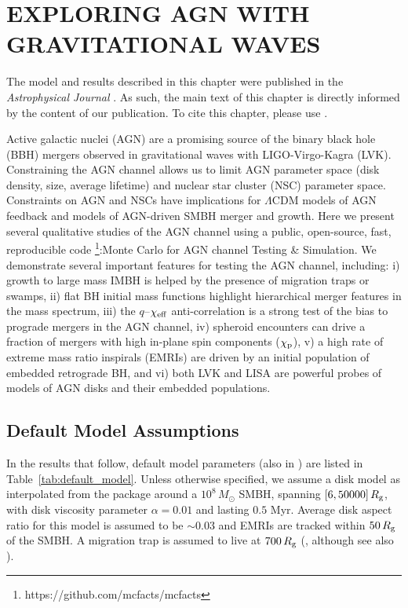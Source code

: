 
\section{\texorpdfstring{\MakeUppercase{exploring agn with gravitational waves}}{exploring agn with gravitational waves}}
\label{sec:chapter-agnbbh}


\par The model and results described in this chapter were published in the \textit{Astrophysical Journal} \citep{McKernan+25-mcfactsI}.
As such, the main text of this chapter is directly informed by the content of our publication.
To cite this chapter, please use \citet{McKernan+25-mcfactsI}.


Active galactic nuclei (AGN) are a promising source of the binary black hole (BBH) mergers observed in gravitational waves with LIGO-Virgo-Kagra (LVK).
Constraining the AGN channel allows us to limit AGN parameter space (disk density, size, average lifetime) and nuclear star cluster (NSC) parameter space.
Constraints on AGN and NSCs have implications for $\Lambda$CDM models of AGN feedback and models of AGN-driven SMBH merger and growth.
Here we present several qualitative studies of the AGN channel using a public, open-source, fast, reproducible code \footnote{https://github.com/mcfacts/mcfacts}:Monte Carlo for AGN channel Testing \& Simulation.
We demonstrate several important features for testing the AGN channel, including:
i) growth to large mass IMBH is helped by the presence of migration traps or swamps,
ii) flat BH initial mass functions highlight hierarchical merger features in the mass spectrum,
iii) the $q$--$\chi_{\rm eff}$ anti-correlation is a strong test of the bias to prograde mergers in the AGN channel,
iv) spheroid encounters can drive a fraction of mergers with high in-plane spin components ($\chi_{\rm p}$),
v) a high rate of extreme mass ratio inspirals (EMRIs) are driven by an initial population of embedded retrograde BH, and
vi) both LVK and LISA are powerful probes of models of AGN disks and their embedded populations.


\subsection{Default Model Assumptions}
\label{sec:mcfacts-assumptions}

In the results that follow, default model parameters (also in ) are listed in Table~\ref{tab:default_model}. Unless otherwise specified, we assume a \citet{SirkoGoodman03} disk model as interpolated from the  package \citep{Gangardt+24-pAGN} around a $10^{8}\,M_{\odot}$ SMBH, spanning $[6,50000]\,R_{\rm g}$, with disk viscosity parameter $\alpha=0.01$ and lasting $0.5$ Myr. Average disk aspect ratio for this model is assumed to be $\sim 0.03$ and EMRIs are tracked within $50\,R_{\rm g}$ of the SMBH. A migration trap is assumed to live at $700\,R_{\rm g}$ (\citealt{Bellovary+16}, although see also \citealt{Grishin+23}). 

